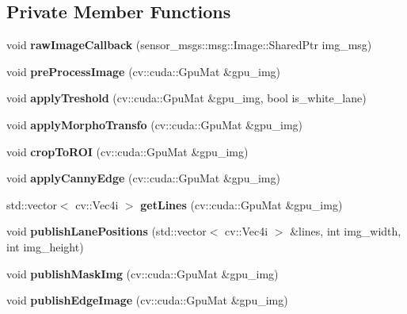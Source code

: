 \subsection*{Private Member Functions}
\begin{DoxyCompactItemize}
\item 
\mbox{\label{classVisionNode_aabbd33da50754623d30ba7c8c41dc2bc}} 
void {\bfseries raw\+Image\+Callback} (sensor\+\_\+msgs\+::msg\+::\+Image\+::\+Shared\+Ptr img\+\_\+msg)
\item 
\mbox{\label{classVisionNode_ae2b6a2048ef69189b097ddc79b085603}} 
void {\bfseries pre\+Process\+Image} (cv\+::cuda\+::\+Gpu\+Mat \&gpu\+\_\+img)
\item 
\mbox{\label{classVisionNode_a234d00d510249ff752af20a64b8618bd}} 
void {\bfseries apply\+Treshold} (cv\+::cuda\+::\+Gpu\+Mat \&gpu\+\_\+img, bool is\+\_\+white\+\_\+lane)
\item 
\mbox{\label{classVisionNode_a6a6385ceaa4a9bb1e3d50dd2e55fb071}} 
void {\bfseries apply\+Morpho\+Transfo} (cv\+::cuda\+::\+Gpu\+Mat \&gpu\+\_\+img)
\item 
\mbox{\label{classVisionNode_a7d60e45e5c445469ecb9f298c47bf5c8}} 
void {\bfseries crop\+To\+R\+OI} (cv\+::cuda\+::\+Gpu\+Mat \&gpu\+\_\+img)
\item 
\mbox{\label{classVisionNode_ace70a008db68efbf89cc43e485e06744}} 
void {\bfseries apply\+Canny\+Edge} (cv\+::cuda\+::\+Gpu\+Mat \&gpu\+\_\+img)
\item 
\mbox{\label{classVisionNode_adf0f075a5d4706a887ba3198799a836f}} 
std\+::vector$<$ cv\+::\+Vec4i $>$ {\bfseries get\+Lines} (cv\+::cuda\+::\+Gpu\+Mat \&gpu\+\_\+img)
\item 
\mbox{\label{classVisionNode_a4d826b83d642f5033c796a8f89cd2b58}} 
void {\bfseries publish\+Lane\+Positions} (std\+::vector$<$ cv\+::\+Vec4i $>$ \&lines, int img\+\_\+width, int img\+\_\+height)
\item 
\mbox{\label{classVisionNode_afa493f144507b0de569a5935a54661f1}} 
void {\bfseries publish\+Mask\+Img} (cv\+::cuda\+::\+Gpu\+Mat \&gpu\+\_\+img)
\item 
\mbox{\label{classVisionNode_ac7f9f0b9c0c06f4446627de8d93dcd05}} 
void {\bfseries publish\+Edge\+Image} (cv\+::cuda\+::\+Gpu\+Mat \&gpu\+\_\+img)
\end{DoxyCompactItemize}
